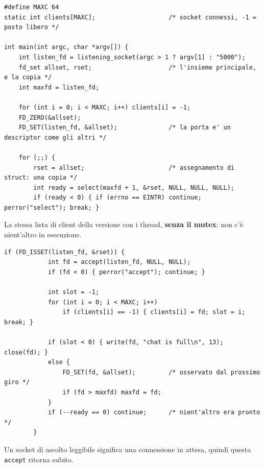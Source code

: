 
\begin{lstlisting}[language={[POSIX]C}, style=wnumbers, title={Lo stato del server}]
#define MAXC 64
static int clients[MAXC];                    /* socket connessi, -1 = posto libero */

int main(int argc, char *argv[]) {
    int listen_fd = listening_socket(argc > 1 ? argv[1] : "5000");
    fd_set allset, rset;                     /* l'insieme principale, e la copia */
    int maxfd = listen_fd;

    for (int i = 0; i < MAXC; i++) clients[i] = -1;
    FD_ZERO(&allset);
    FD_SET(listen_fd, &allset);              /* la porta e' un descriptor come gli altri */

    for (;;) {
        rset = allset;                       /* assegnamento di struct: una copia */
        int ready = select(maxfd + 1, &rset, NULL, NULL, NULL);
        if (ready < 0) { if (errno == EINTR) continue; perror("select"); break; }
\end{lstlisting}

La stessa lista di client della versione con i thread, \textbf{senza il mutex}: non c'è nient'altro in esecuzione.

\begin{lstlisting}[language={[POSIX]C}, style=wnumbers, title={Arriva una connessione sul socket di ascolto}]
        if (FD_ISSET(listen_fd, &rset)) {
            int fd = accept(listen_fd, NULL, NULL);
            if (fd < 0) { perror("accept"); continue; }

            int slot = -1;
            for (int i = 0; i < MAXC; i++)
                if (clients[i] == -1) { clients[i] = fd; slot = i; break; }

            if (slot < 0) { write(fd, "chat is full\n", 13); close(fd); }
            else {
                FD_SET(fd, &allset);         /* osservato dal prossimo giro */
                if (fd > maxfd) maxfd = fd;
            }
            if (--ready == 0) continue;      /* nient'altro era pronto */
        }
\end{lstlisting}

Un socket di ascolto leggibile significa una connessione in attesa, quindi questa \texttt{accept} ritorna subito.

